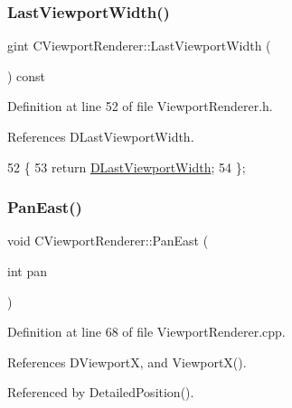 \subsubsection{\texorpdfstring{Last\+Viewport\+Width()}{LastViewportWidth()}}
{\footnotesize\ttfamily gint C\+Viewport\+Renderer\+::\+Last\+Viewport\+Width (\begin{DoxyParamCaption}{ }\end{DoxyParamCaption}) const\hspace{0.3cm}{\ttfamily [inline]}}



Definition at line 52 of file Viewport\+Renderer.\+h.



References D\+Last\+Viewport\+Width.


\begin{DoxyCode}
52                                       \{
53             \textcolor{keywordflow}{return} \hyperlink{classCViewportRenderer_aaa21acd1b43badc3c1a3b0bf9b0f86f9}{DLastViewportWidth};
54         \};
\end{DoxyCode}
\hypertarget{classCViewportRenderer_a047d0b83f7744a9d8b184471dae0cd3c}{}\label{classCViewportRenderer_a047d0b83f7744a9d8b184471dae0cd3c} 
\subsubsection{\texorpdfstring{Pan\+East()}{PanEast()}}
{\footnotesize\ttfamily void C\+Viewport\+Renderer\+::\+Pan\+East (\begin{DoxyParamCaption}\item[{int}]{pan }\end{DoxyParamCaption})}



Definition at line 68 of file Viewport\+Renderer.\+cpp.



References D\+ViewportX, and Viewport\+X().



Referenced by Detailed\+Position().


